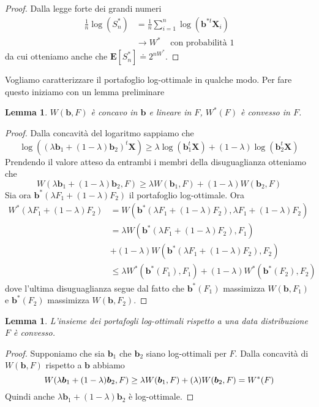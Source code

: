 \documentclass[a4paper,11pt]{book}
\theoremstyle{plain}
\newtheorem{lemma}[teo]{Lemma}
\theoremstyle{definition}
\theoremstyle{remark}
\newcommand{\X}{\bm{X}}
\newcommand{\B}{\bm{b}}
\newcommand{\E}{\mathbf{E}}
\begin{document}
\begin{proof}
	Dalla legge forte dei grandi numeri
	\begin{equation*}
		\begin{split}
		\frac{1}{n}\log(S_n^*) & = \frac{1}{n}\sum_{i = 1}^{n}{\log(\B^{*t}\X_i)}\\
		& \rightarrow W^* \;\;\;\; \text{con probabilità }1
		\end{split}
	\end{equation*}
	da cui otteniamo anche che $\E[S^*_n] \doteq 2^{nW^*}$.
\end{proof}

Vogliamo caratterizzare il portafoglio log-ottimale in qualche modo. Per fare questo iniziamo con un lemma preliminare
\begin{lemma}
	$W(\B,F)$ è concavo in $\B$ e lineare in $F$, $W^*(F)$ è convesso in $F$.
\end{lemma}
\begin{proof}
	Dalla concavità del logaritmo sappiamo che
	\begin{equation*}
		\log((\lambda\B_1+(1-\lambda)\B_2)^t\X)\geq\lambda\log(\B_1^t\X)+(1-\lambda)\log(\B_2^t\X)
	\end{equation*}
	Prendendo il valore atteso da entrambi i membri della disuguaglianza otteniamo che
	\begin{equation*}
		W(\lambda\B_1+(1-\lambda)\B_2, F)\geq \lambda W(\B_1,F) + (1-\lambda)W(\B_2,F)
	\end{equation*}
	Sia ora $\B^*(\lambda F_1+(1-\lambda)F_2)$ il portafoglio log-ottimale. Ora
	\begin{equation*}
		\begin{split}
		W^*(\lambda F_1+(1-\lambda)F_2)
		& = W(\B^*(\lambda F_1+(1-\lambda)F_2),\lambda F_1+(1-\lambda)F_2)\\
		& = \lambda W(\B^*(\lambda F_1+(1-\lambda)F_2),F_1)\\
		& +(1-\lambda)W(\B^*(\lambda F_1+(1-\lambda)F_2),F_2)\\
		& \leq \lambda W^*(\B^*(F_1),F_1) + (1-\lambda)W^*(\B^*(F_2),F_2)
		\end{split}
	\end{equation*}
	dove l'ultima disuguaglianza segue dal fatto che $\B^*(F_1)$ massimizza $W(\B,F_1)$ e $\B^*(F_2)$ massimizza $W(\B,F_2)$. 
\end{proof}
\begin{lemma}
	L'insieme dei portafogli log-ottimali rispetto a una data distribuzione $F$ è convesso.
\end{lemma}
\begin{proof}
	Supponiamo che sia $\B_1$ che $\B_2$ siano log-ottimali per $F$. Dalla concavità di $W(\B,F)$ rispetto a $\B$ abbiamo
	\begin{equation*}
	W(\lambda\B_1 + (1-\lambda)\B_2,F)\geq \lambda W(\B_1,F)  + (\-\lambda)W(\B_2,F) = W^*(F)
	\end{equation*}
	Quindi anche $\lambda\B_1 + (1-\lambda)\B_2$ è log-ottimale.
\end{proof}
\end{document}
